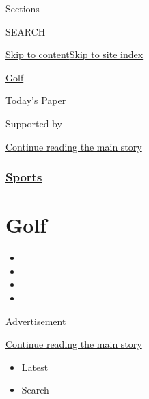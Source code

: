 Sections

SEARCH

\protect\hyperlink{site-content}{Skip to
content}\protect\hyperlink{site-index}{Skip to site index}

\href{https://www.nytimes.com/section/sports/golf}{Golf}

\href{https://myaccount.nytimes.com/auth/login?response_type=cookie\&client_id=vi}{}

\href{https://www.nytimes.com/section/todayspaper}{Today's Paper}

Supported by

\protect\hyperlink{after-sponsor}{Continue reading the main story}

\hypertarget{sports}{%
\subsubsection{\texorpdfstring{\href{/section/sports}{Sports}}{Sports}}\label{sports}}

\hypertarget{golf}{%
\section{Golf}\label{golf}}

\begin{itemize}
\item
\item
\item
\item
\end{itemize}

Advertisement

\protect\hyperlink{after-subheader}{Continue reading the main story}

\begin{itemize}
\tightlist
\item
  \protect\hyperlink{stream-panel}{Latest}
\item
  Search
\end{itemize}

